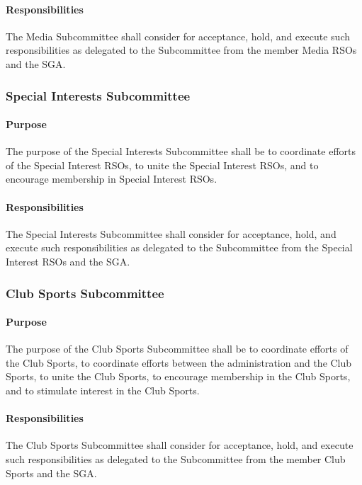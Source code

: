 \documentclass[12pt]{scrreprt}
\begin{document}
\paragraph{Responsibilities}
​The Media Subcommittee shall consider for acceptance, hold, and
execute such responsibilities as delegated to the Subcommittee from the member Media
RSOs and the SGA.

\subsubsection{Special Interests Subcommittee}

\paragraph{Purpose}
The purpose of the Special Interests Subcommittee shall be to coordinate
efforts of the Special Interest RSOs, to unite the Special Interest RSOs, and to encourage
membership in Special Interest RSOs.

\paragraph{Responsibilities}
​The Special Interests Subcommittee shall consider for acceptance,
hold, and execute such responsibilities as delegated to the Subcommittee from the Special
Interest RSOs and the SGA.

\subsubsection{Club Sports Subcommittee}

\paragraph{Purpose}
The purpose of the Club Sports Subcommittee shall be to coordinate efforts of
the Club Sports, to coordinate efforts between the administration and the Club Sports, to
unite the Club Sports, to encourage membership in the Club Sports, and to stimulate
interest in the Club Sports.

\paragraph{Responsibilities}
​The Club Sports Subcommittee shall consider for acceptance, hold,
and execute such responsibilities as delegated to the Subcommittee from the member Club
Sports and the SGA.
\end{document}
